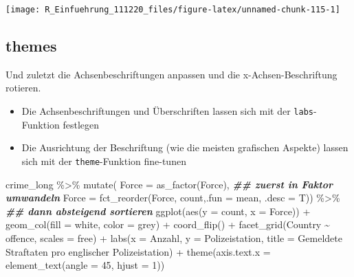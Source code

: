 \documentclass[
]{book}
\newenvironment{Shaded}{\begin{snugshade}}{\end{snugshade}}
\newcommand{\AttributeTok}[1]{\textcolor[rgb]{0.77,0.63,0.00}{#1}}
\newcommand{\DecValTok}[1]{\textcolor[rgb]{0.00,0.00,0.81}{#1}}
\newcommand{\DocumentationTok}[1]{\textcolor[rgb]{0.56,0.35,0.01}{\textbf{\textit{#1}}}}
\newcommand{\FunctionTok}[1]{\textcolor[rgb]{0.00,0.00,0.00}{#1}}
\newcommand{\NormalTok}[1]{#1}
\newcommand{\SpecialCharTok}[1]{\textcolor[rgb]{0.00,0.00,0.00}{#1}}
\newcommand{\StringTok}[1]{\textcolor[rgb]{0.31,0.60,0.02}{#1}}
\begin{document}
\begin{center}\texttt{[image: R\_Einfuehrung\_111220\_files/figure-latex/unnamed-chunk-115-1]} \end{center}

\hypertarget{themes}{%
\subsection{themes}\label{themes}}

Und zuletzt die Achsenbeschriftungen anpassen und die x-Achsen-Beschriftung rotieren.

\begin{itemize}
\item
  Die Achsenbeschriftungen und Überschriften lassen sich mit der \texttt{labs}-Funktion festlegen
\item
  Die Ausrichtung der Beschriftung (wie die meisten grafischen Aspekte) lassen sich mit der \texttt{theme}-Funktion fine-tunen
\end{itemize}

\begin{Shaded}
\begin{Highlighting}[]
\NormalTok{crime\_long }\SpecialCharTok{\%\textgreater{}\%} 
  \FunctionTok{mutate}\NormalTok{(}
      \AttributeTok{Force =} \FunctionTok{as\_factor}\NormalTok{(Force), }\DocumentationTok{\#\# zuerst in Faktor umwandeln}
      \AttributeTok{Force =} \FunctionTok{fct\_reorder}\NormalTok{(Force, count,}\AttributeTok{.fun =}\NormalTok{ mean, }\AttributeTok{.desc =}\NormalTok{ T)) }\SpecialCharTok{\%\textgreater{}\%} \DocumentationTok{\#\# dann absteigend sortieren}
\FunctionTok{ggplot}\NormalTok{(}\FunctionTok{aes}\NormalTok{(}\AttributeTok{y =}\NormalTok{ count,}
             \AttributeTok{x =}\NormalTok{ Force)) }\SpecialCharTok{+}
  \FunctionTok{geom\_col}\NormalTok{(}\AttributeTok{fill =} \StringTok{\textquotesingle{}white\textquotesingle{}}\NormalTok{,}
           \AttributeTok{color =} \StringTok{\textquotesingle{}grey\textquotesingle{}}\NormalTok{) }\SpecialCharTok{+}
  \FunctionTok{coord\_flip}\NormalTok{() }\SpecialCharTok{+}
  \FunctionTok{facet\_grid}\NormalTok{(Country }\SpecialCharTok{\textasciitilde{}}\NormalTok{ offence, }
             \AttributeTok{scales =} \StringTok{\textquotesingle{}free\textquotesingle{}}\NormalTok{) }\SpecialCharTok{+}
  \FunctionTok{labs}\NormalTok{(}\AttributeTok{x =} \StringTok{\textquotesingle{}Anzahl\textquotesingle{}}\NormalTok{,}
       \AttributeTok{y =} \StringTok{\textquotesingle{}Polizeistation\textquotesingle{}}\NormalTok{,}
       \AttributeTok{title =} \StringTok{\textquotesingle{}Gemeldete Straftaten pro englischer Polizeistation\textquotesingle{}}\NormalTok{) }\SpecialCharTok{+}
  \FunctionTok{theme}\NormalTok{(}\AttributeTok{axis.text.x =} \FunctionTok{element\_text}\NormalTok{(}\AttributeTok{angle =} \DecValTok{45}\NormalTok{,}
                                   \AttributeTok{hjust =} \DecValTok{1}\NormalTok{))}
\end{Highlighting}
\end{Shaded}
\end{document}
